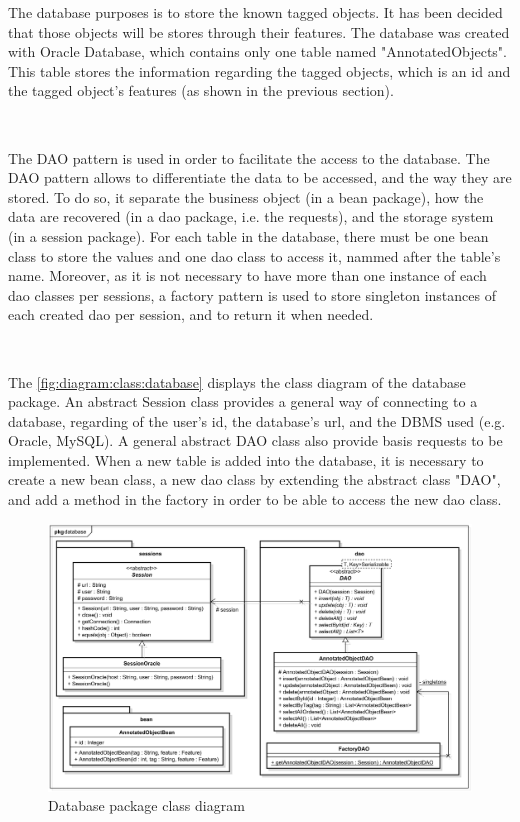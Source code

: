 The database purposes is to store the known tagged objects. It has been decided that those objects will be stores through their features. The database was created with Oracle Database, which contains only one table named "AnnotatedObjects". This table stores the information regarding the tagged objects, which is an id and the tagged object's features (as shown in the previous section).

~~

The \gls{DAO} pattern is used in order to facilitate the access to the database. The \gls{DAO} pattern allows to differentiate the data to be accessed, and the way they are stored. To do so, it separate the business object (in a bean package), how the data are recovered (in a dao package, i.e. the requests), and the storage system (in a session package). For each table in the database, there must be one bean class to store the values and one dao class to access it, nammed after the table's name. Moreover, as it is not necessary to have more than one instance of each dao classes per sessions, a factory pattern is used to store singleton instances of each created dao per session, and to return it when needed.

~~


The \vref{fig:diagram:class:database} displays the class diagram of the database package. An abstract Session class provides a general way of connecting to a database, regarding of the user's id, the database's url, and the \gls{DBMS} used (e.g. Oracle, MySQL). A general abstract DAO class also provide basis requests to be implemented. When a new table is added into the database, it is necessary to create a new bean class, a new dao class by extending the abstract class "DAO", and add a method in the factory in order to be able to access the new dao class.


\begin{figure}[H]
	\centering 
	\includegraphics[width=1\textwidth]{images/diagrams/class_diagram_database}
	\caption{Database package class diagram}
	\label{fig:diagram:class:database}
\end{figure}



